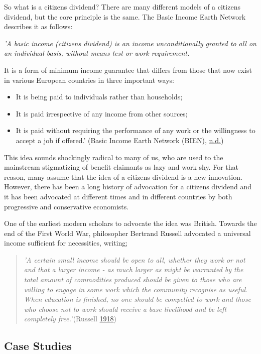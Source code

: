 \documentclass[]{tufte-handout}
\providecommand{\tightlist}{%
  \setlength{\itemsep}{0pt}\setlength{\parskip}{0pt}}
\begin{document}
So what is a citizens dividend? There are many different models of a
citizens dividend, but the core principle is the same. The Basic Income
Earth Network describes it as follows:

\emph{'A basic income (citizens dividend) is an income unconditionally
granted to all on an individual basis, without means test or work
requirement.}

It is a form of minimum income guarantee that differs from those that
now exist in various European countries in three important ways:

\begin{itemize}
\tightlist
\item
  It is being paid to individuals rather than households;
\item
  It is paid irrespective of any income from other sources;
\item
  It is paid without requiring the performance of any work or the
  willingness to accept a job if offered.' (Basic Income Earth Network
  (BIEN), \protect\hyperlink{ref-BasicIncomeEarthNetworkBIEN}{n.d.})
\end{itemize}

This idea sounds shockingly radical to many of us, who are used to the
mainstream stigmatizing of benefit claimants as lazy and work shy. For
that reason, many assume that the idea of a citizens dividend is a new
innovation. However, there has been a long history of advocation for a
citizens dividend and it has been advocated at different times and in
different countries by both progressive and conservative economists.

One of the earliest modern scholars to advocate the idea was British.
Towards the end of the First World War, philosopher Bertrand Russell
advocated a universal income sufficient for necessities, writing;

\begin{quote}
\emph{'A certain small income should be open to all, whether they work
or not and that a larger income - as much larger as might be warranted
by the total amount of commodities produced should be given to those who
are willing to engage in some work which the community recognise as
useful. When education is finished, no one should be compelled to work
and those who choose not to work should receive a base livelihood and be
left completely free.}'(Russell
\protect\hyperlink{ref-BertrandRussell1918}{1918})
\end{quote}

\hypertarget{case-studies}{%
\subsection{Case Studies}\label{case-studies}}
\end{document}
